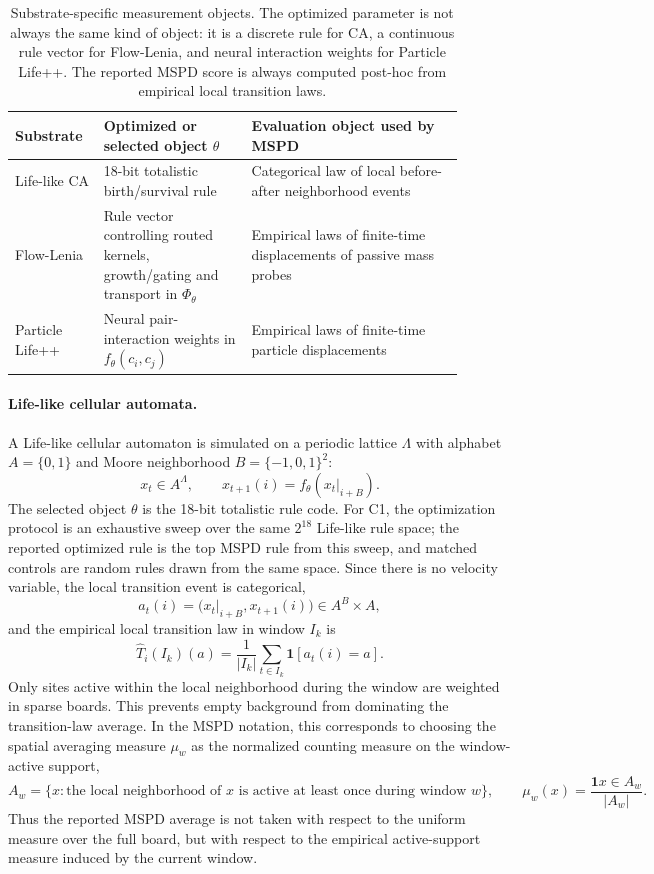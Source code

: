\begin{table}[H]
\centering
\footnotesize
\begin{tabular}{p{0.16\linewidth}p{0.30\linewidth}p{0.43\linewidth}}
\toprule
Substrate & Optimized or selected object $\theta$ & Evaluation object used by MSPD \\
\midrule
Life-like CA & 18-bit totalistic birth/survival rule & Categorical law of local before-after neighborhood events \\
Flow-Lenia & Rule vector controlling routed kernels, growth/gating and transport in $\Phi_\theta$ & Empirical laws of finite-time displacements of passive mass probes \\
Particle Life++ & Neural pair-interaction weights in $f_\theta(c_i,c_j)$ & Empirical laws of finite-time particle displacements \\
\bottomrule
\end{tabular}
\caption{Substrate-specific measurement objects.  The optimized parameter is not always the same kind of object: it is a discrete rule for CA, a continuous rule vector for Flow-Lenia, and neural interaction weights for Particle Life++.  The reported MSPD score is always computed post-hoc from empirical local transition laws.}
\label{tab:optimized-objects}
\end{table}
\FloatBarrier

\paragraph{Life-like cellular automata.}
A Life-like cellular automaton is simulated on a periodic lattice $\Lambda$ with alphabet $A=\{0,1\}$ and Moore neighborhood $B=\{-1,0,1\}^2$:
\[
  x_t\in A^\Lambda,
  \qquad x_{t+1}(i)=f_\theta(x_t|_{i+B}).
\]
The selected object $\theta$ is the 18-bit totalistic rule code.  For C1, the optimization protocol is an exhaustive sweep over the same $2^{18}$ Life-like rule space; the reported optimized rule is the top MSPD rule from this sweep, and matched controls are random rules drawn from the same space.  Since there is no velocity variable, the local transition event is categorical,
\[
  a_t(i)=\bigl(x_t|_{i+B},x_{t+1}(i)\bigr)\in A^B\times A,
\]
and the empirical local transition law in window $I_k$ is
\[
  \widehat T_i(I_k)(a)=\frac{1}{|I_k|}\sum_{t\in I_k}\mathbf 1[a_t(i)=a].
\]
Only sites active within the local neighborhood during the window are weighted in sparse boards.  This prevents empty background from dominating the transition-law average. In the MSPD notation, this corresponds to choosing the spatial averaging measure $\mu_w$ as the normalized counting measure on the window-active support,
\[
A_w=\{x:\text{the local neighborhood of }x\text{ is active at least once during window }w\},
\qquad
\mu_w(x)=\frac{\mathbf 1{x\in A_w}}{|A_w|}.
\]
Thus the reported MSPD average is not taken with respect to the uniform measure over the full board, but with respect to the empirical active-support measure induced by the current window.



